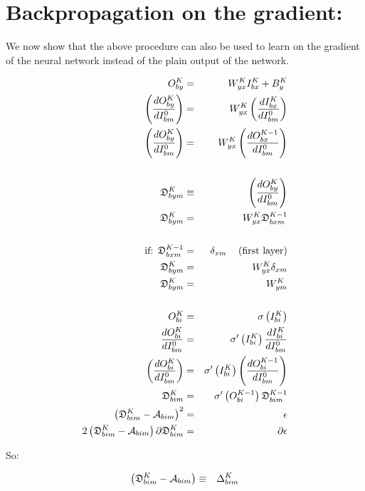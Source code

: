 \section{Backpropagation on the gradient:}

We now show that the above procedure can also be used to learn on
the gradient of the neural network instead of the plain output of
the network.

\begin{eqnarray*}
    O_{by}^{K} & = & W_{yx}^{K}I_{bx}^{K}+B_{y}^{K}\\
    \left(\frac{dO_{by}^{K}}{dI_{bm}^{0}}\right) & = & W_{yx}^{K}\left(\frac{dI_{bx}^{K}}{dI_{bm}^{0}}\right)\\
    \left(\frac{dO_{by}^{K}}{dI_{bm}^{0}}\right) & = & W_{yx}^{K}\left(\frac{dO_{bx}^{K-1}}{dI_{bm}^{0}}\right)\\
    \\
    \mathfrak{D}_{bym}^{K} & \equiv & \left(\frac{dO_{by}^{K}}{dI_{bm}^{0}}\right)\\
    \mathfrak{D}_{bym}^{K} & = & W_{yx}^{K}\mathfrak{D}_{bxm}^{K-1}\\
    \\
    \text{if: }\mathfrak{D}_{bxm}^{K-1} & = & \delta_{xm}\quad\left(\text{first layer}\right)\\
    \mathfrak{D}_{bym}^{K} & = & W_{yx}^{K}\delta_{xm}\\
    \mathfrak{D}_{bym}^{K} & = & W_{ym}^{K}\\
    \\
    O_{bi}^{K} & = & \sigma\left(I_{bi}^{K}\right)\\
    \frac{dO_{bi}^{K}}{dI_{bm}^{0}} & = & \sigma^{\prime}\left(I_{bi}^{K}\right)\frac{dI_{bi}^{K}}{dI_{bm}^{0}}\\
    \left(\frac{dO_{bi}^{K}}{dI_{bm}^{0}}\right) & = & \sigma^{\prime}\left(I_{bi}^{K}\right)\left(\frac{dO_{bi}^{K-1}}{dI_{bm}^{0}}\right)\\
    \mathfrak{D}_{bim}^{K} & = & \sigma^{\prime}\left(O_{bi}^{K-1}\right)\mathfrak{D}_{bim}^{K-1}\\
    \left(\mathfrak{D}_{bim}^{K}-{\cal A}_{bim}\right)^{2} & = & \epsilon\\
    2\left(\mathfrak{D}_{bim}^{K}-{\cal A}_{bim}\right)\partial\mathfrak{D}_{bim}^{K} & = & \partial\epsilon
\end{eqnarray*}

So:

\begin{eqnarray*}
    \left(\mathfrak{D}_{bim}^{K}-{\cal A}_{bim}\right) & \equiv & \Delta_{bim}^{K}
\end{eqnarray*}


